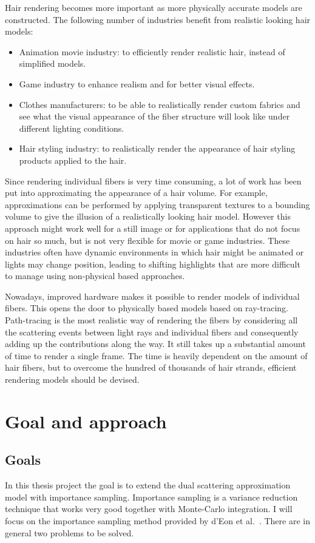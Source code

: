 \documentclass[11pt,a4paper]{report}
\begin{document}
Hair rendering becomes more important as more physically accurate models are constructed. The following number of industries benefit from realistic looking hair models:

\begin{itemize}
\item Animation movie industry: to efficiently render realistic hair, instead of simplified models.
\item Game industry to enhance realism and for better visual effects.
\item Clothes manufacturers: to be able to realistically render custom fabrics and see what the visual appearance of the fiber structure will look like under different lighting conditions.
\item Hair styling industry: to realistically render the appearance of hair styling products applied to the hair.
\end{itemize}

Since rendering individual fibers is very time consuming, a lot of work has been put into approximating the appearance of a hair volume. For example, approximations can be performed by applying transparent textures to a bounding volume to give the illusion of a realistically looking hair model. However this approach might work well for a still image or for applications that do not focus on hair so much, but is not very flexible for movie or game industries. These industries often have dynamic environments in which hair might be animated or lights may change position, leading to shifting highlights that are more difficult to manage using non-physical based approaches.

Nowadays, improved hardware makes it possible to render models of individual fibers. This opens the door to physically based models based on ray-tracing. Path-tracing is the most realistic way of rendering the fibers by considering all the scattering events between light rays and individual fibers and consequently adding up the contributions along the way. It still takes up a substantial amount of time to render a single frame. The time is heavily dependent on the amount of hair fibers, but to overcome the hundred of thousands of hair strands, efficient rendering models should be devised.


\section{Goal and approach}

\subsection*{Goals}
In this thesis project the goal is to extend the dual scattering approximation model with importance sampling. Importance sampling is a variance reduction technique that works very good together with Monte-Carlo integration. I will focus on the importance sampling method provided by d'Eon et al.~\cite{eon2013}. There are in general two problems to be solved.
\end{document}
